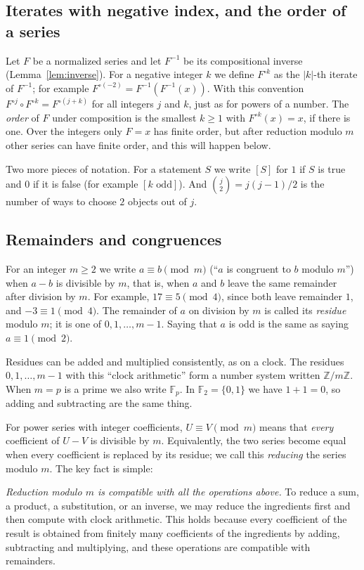 \documentclass[11pt,a4paper]{article}
\theoremstyle{definition}
\theoremstyle{remark}
\newcommand{\Z}{\mathbb{Z}}
\newcommand{\F}{\mathbb{F}}
\begin{document}
\subsection{Iterates with negative index, and the order of a series}
Let $F$ be a normalized series and let $F^{-1}$ be its compositional inverse (Lemma~\ref{lem:inverse}). For a
negative integer $k$ we define $F^{\circ k}$ as the $|k|$-th iterate of $F^{-1}$; for example
$F^{\circ(-2)}=F^{-1}(F^{-1}(x))$. With this convention $F^{\circ j}\circ F^{\circ k}=F^{\circ(j+k)}$ for all integers
$j$ and $k$, just as for powers of a number. The \emph{order} of $F$ under composition is the smallest $k\ge1$ with
$F^{\circ k}(x)=x$, if there is one. Over the integers only $F=x$ has finite order, but after reduction modulo $m$
other series can have finite order, and this will happen below.

Two more pieces of notation. For a statement $S$ we write $[S]$ for $1$ if $S$ is true and $0$ if it is false
(for example $[k\text{ odd}]$). And $\binom{j}{2}=j(j-1)/2$ is the number of ways to choose $2$ objects out of $j$.

\subsection{Remainders and congruences}
For an integer $m\ge2$ we write $a\equiv b\pmod m$ (``$a$ is congruent to $b$ modulo $m$'') when $a-b$ is divisible by
$m$, that is, when $a$ and $b$ leave the same remainder after division by $m$. For example, $17\equiv5\pmod 4$, since both leave remainder $1$, and $-3\equiv1\pmod4$. The
remainder of $a$ on division by $m$ is called its \emph{residue} modulo $m$; it is one of $0,1,\dots,m-1$. Saying that
$a$ is odd is the same as saying $a\equiv1\pmod2$.

Residues can be added and multiplied consistently, as on a clock. The residues $0,1,\dots,m-1$ with this ``clock
arithmetic'' form a number system written $\Z/m\Z$. When $m=p$ is a prime we also write $\F_p$. In $\F_2=\{0,1\}$ we
have $1+1=0$, so adding and subtracting are the same thing.

For power series with integer coefficients, $U\equiv V\pmod m$ means that \emph{every} coefficient of $U-V$ is
divisible by $m$. Equivalently, the two series become equal when every coefficient is replaced by its residue; we call
this \emph{reducing} the series modulo $m$. The key fact is simple:

\emph{Reduction modulo $m$ is compatible with all the operations above.} To reduce a sum, a product, a substitution, or
an inverse, we may reduce the ingredients first and then compute with clock arithmetic. This holds because every
coefficient of the result is obtained from finitely many coefficients of the ingredients by adding, subtracting and
multiplying, and these operations are compatible with remainders.
\end{document}
